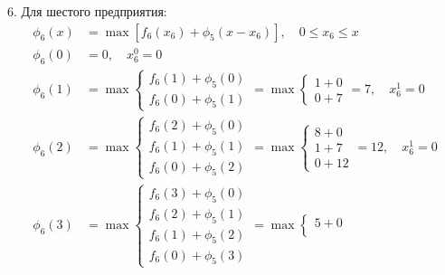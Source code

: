 \documentclass{article}
\begin{document}
6. Для шестого предприятия:
\[
    \begin{aligned}
        \phi_6(x) & = \max \left[ f_6(x_6) + \phi_5(x - x_6) \right], \quad 0 \leq x_6 \leq x \\
        \phi_6(0) & = 0, \quad x_6^0 = 0                                                      \\
        \phi_6(1) & = \max \begin{cases}
                               f_6(1) + \phi_5(0) \\
                               f_6(0) + \phi_5(1)
                           \end{cases} = \max \begin{cases}
                                                  1 + 0 \\
                                                  0 + 7
                                              \end{cases} = 7, \quad x_6^1 = 0                \\
        \phi_6(2) & = \max \begin{cases}
                               f_6(2) + \phi_5(0) \\
                               f_6(1) + \phi_5(1) \\
                               f_6(0) + \phi_5(2)
                           \end{cases} = \max \begin{cases}
                                                  8 + 0 \\
                                                  1 + 7 \\
                                                  0 + 12
                                              \end{cases} = 12, \quad x_6^1 = 0               \\
        \phi_6(3) & = \max \begin{cases}
                               f_6(3) + \phi_5(0) \\
                               f_6(2) + \phi_5(1) \\
                               f_6(1) + \phi_5(2) \\
                               f_6(0) + \phi_5(3)
                           \end{cases} = \max \begin{cases}
                                                  5 + 0  \\

\end{cases}
\end{aligned}\]
\end{document}
